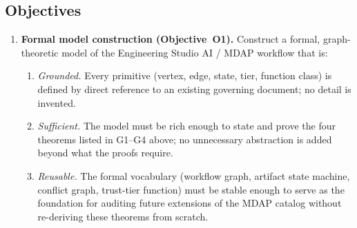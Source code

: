 \documentclass[12pt]{article}
\theoremstyle{definition}
\begin{document}
\subsection{Objectives}
\label{sec:intro:objectives}

\begin{enumerate}

    \item \textbf{Formal model construction (Objective~O1).}
          Construct a formal, graph-theoretic model of the Engineering
          Studio AI / MDAP workflow that is:
          \begin{enumerate}
              \item[O1a.] \emph{Grounded.}  Every primitive (vertex,
                          edge, state, tier, function class) is defined
                          by direct reference to an existing governing
                          document; no detail is invented.
              \item[O1b.] \emph{Sufficient.}  The model must be rich
                          enough to state and prove the four theorems
                          listed in G1--G4 above; no unnecessary
                          abstraction is added beyond what the proofs
                          require.
              \item[O1c.] \emph{Reusable.}  The formal vocabulary
                          (workflow graph, artifact state machine,
                          conflict graph, trust-tier function) must be
                          stable enough to serve as the foundation for
                          auditing future extensions of the MDAP catalog
                          without re-deriving these theorems from scratch.
          \end{enumerate}


\end{enumerate}
\end{document}
